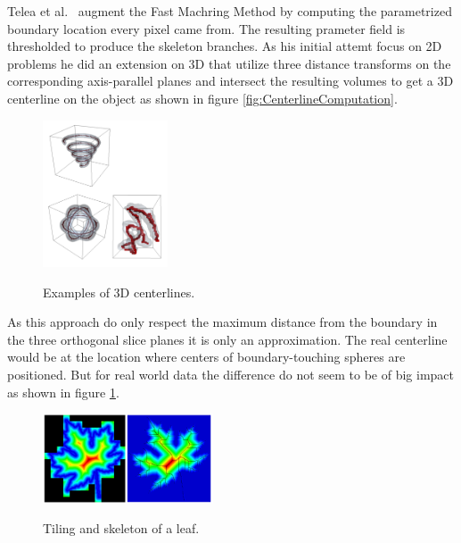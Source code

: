 Telea et al.~\cite{alexandru2002augmented} augment the Fast Machring Method by computing the parametrized boundary location every pixel came from. The resulting prameter field is thresholded to produce the skeleton branches.
As his initial attemt focus on 2D problems he did an extension on 3D that utilize three distance transforms on the corresponding axis-parallel planes and intersect the resulting volumes to get a 3D centerline on the object as shown in figure \ref{fig:CenterlineComputation}.

\begin{figure}[h]
	\centering
	\includegraphics[width=0.33\textwidth]{./Images/ExampleCenterlines_II.png} \\
	\caption{Examples of 3D centerlines.}
	\cite{alexandru2002augmented}
	\label{fig:ExampleCenterlines_II}
\end{figure} 

As this approach do only respect the maximum distance from the boundary in the three orthogonal slice planes it is only an approximation. The real centerline would be at the location where centers of boundary-touching spheres are positioned. But for real world data the difference do not seem to be of big impact as shown in figure \ref{fig:ExampleCenterlines_II}. 

\begin{figure}[h]
	\centering
	\includegraphics[width=0.45\textwidth]{./Images/LeafTilingAndDistanceTransform.png} \\
	\caption{Tiling and skeleton of a leaf.}
	\cite{strzodka2004generalized}
	\label{fig:LeafTilingAndDistanceTransform}
\end{figure} 

